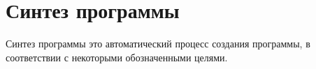 \section{Синтез программы}

Синтез программы это автоматический процесс создания программы, в соответствии с некоторыми обозначенными целями.





